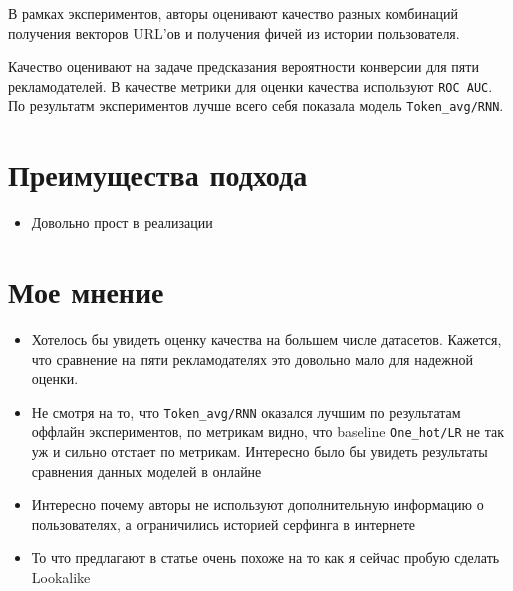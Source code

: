 В рамках экспериментов, авторы оценивают качество разных комбинаций получения векторов URL'ов и получения фичей из истории пользователя.

Качество оценивают на задаче предсказания вероятности конверсии для пяти рекламодателей. В качестве метрики для оценки качества используют \texttt{ROC AUC}. \\

По результатм экспериментов лучше всего себя показала модель \texttt{Token\_avg/RNN}.

\section{Преимущества подхода}

\begin{itemize}
    \item Довольно прост в реализации
\end{itemize}

\section{Мое мнение}

\begin{itemize}
    \item Хотелось бы увидеть оценку качества на большем числе датасетов. Кажется, что сравнение на пяти рекламодателях это довольно мало для надежной оценки.
    \item Не смотря на то, что \texttt{Token\_avg/RNN} оказался лучшим по результатам оффлайн экспериментов, по метрикам видно, что baseline \texttt{One\_hot/LR} не так уж и сильно отстает по метрикам. Интересно было бы увидеть результаты сравнения данных моделей в онлайне
    \item Интересно почему авторы не используют дополнительную информацию о пользователях, а ограничились историей серфинга в интернете
    \item То что предлагают в статье очень похоже на то как я сейчас пробую сделать Lookalike
\end{itemize}

